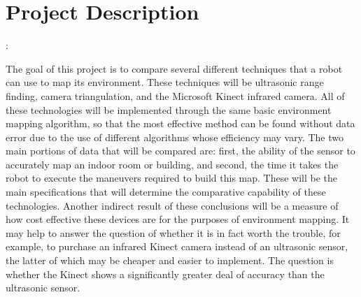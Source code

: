 \documentclass{article}
\begin{document}
\section{Project Description}: 

	The goal of this project is to compare several different
        techniques that a robot can use to map its environment.  These
        techniques will be ultrasonic range finding, camera
        triangulation, and the Microsoft Kinect infrared camera.  All
        of these technologies will be implemented through the same
        basic environment mapping algorithm, so that the most
        effective method can be found without data error due to the
        use of different algorithms whose efficiency may vary.  The
        two main portions of data that will be compared are: first,
        the ability of the sensor to accurately map an indoor room or
        building, and second, the time it takes the robot to execute
        the maneuvers required to build this map.  These will be the
        main specifications that will determine the comparative
        capability of these technologies.  Another indirect result of
        these conclusions will be a measure of how cost effective
        these devices are for the purposes of environment mapping.  It
        may help to answer the question of whether it is in fact worth
        the trouble, for example, to purchase an infrared Kinect
        camera instead of an ultrasonic sensor, the latter of which
        may be cheaper and easier to implement.  The question is
        whether the Kinect shows a significantly greater deal of
        accuracy than the ultrasonic sensor.  
\end{document}
